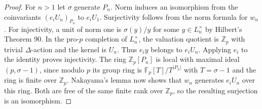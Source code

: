 \documentclass[a4paper,11pt]{article}
\theoremstyle{definition}
\theoremstyle{remark}
\newcommand{\ZZ}{\mathbb Z}\newcommand{\ord}{\operatorname{ord}}
\numberwithin{equation}{section}
\begin{document}
\begin{proof}
For \(n>1\) let \(\sigma\) generate \(P_n\). Norm induces an
isomorphism from the coinvariants \((e_i U_n)_{P_n}\) to \(e_i U_1\).
Surjectivity follows from the norm formula for \(w_n\). For
injectivity, a unit of norm one is \(\sigma(y)/y\) for some
\(y\in L_n^\times\) by Hilbert's Theorem 90. In the pro-\(p\)
completion of \(L_n^\times\), the valuation quotient is \(\ZZ_p\)
with trivial \(\Delta\)-action and the kernel is \(U_n\). Thus
\(e_i y\) belongs to \(e_i U_n\). Applying \(e_i\) to the
identity proves injectivity. The ring \(\ZZ_p[P_n]\) is local
with maximal ideal \((p,\sigma-1)\), since modulo \(p\) its group
ring is \(\mathbb F_p[T]/T^{|P_n|}\) with \(T=\sigma-1\) and
the ring is finite over \(\ZZ_p\). Nakayama's lemma now shows
that \(w_n\) generates \(e_iU_n\) over this ring. Both are free
of the same finite rank over \(\ZZ_p\), so the resulting
surjection is an isomorphism.
\end{proof}
\end{document}
